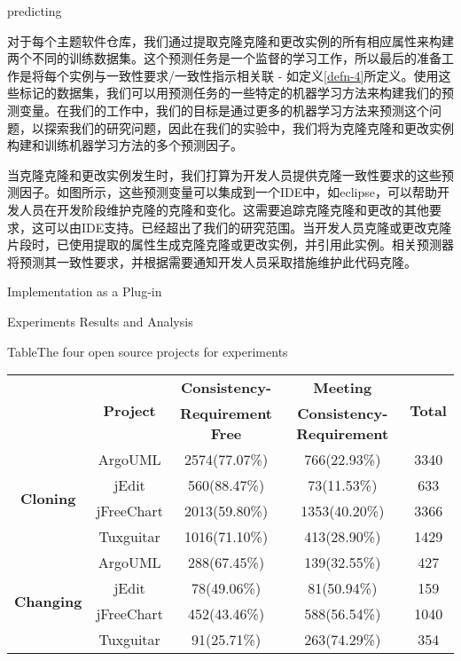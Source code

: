 {predicting}

对于每个主题软件仓库，我们通过提取克隆克隆和更改实例的所有相应属性来构建两个不同的训练数据集。这个预测任务是一个监督的学习工作，所以最后的准备工作是将每个实例与一致性要求/一致性指示相关联 - 如定义\ref {defn-4}所定义。使用这些标记的数据集，我们可以用预测任务的一些特定的机器学习方法来构建我们的预测变量。在我们的工作中，我们的目标是通过更多的机器学习方法来预测这个问题，以探索我们的研究问题，因此在我们的实验中，我们将为克隆克隆和更改实例构建和训练机器学习方法的多个预测因子。

当克隆克隆和更改实例发生时，我们打算为开发人员提供克隆一致性要求的这些预测因子。如图所示，这些预测变量可以集成到一个IDE中，如eclipse，可以帮助开发人员在开发阶段维护克隆的克隆和变化。这需要追踪克隆克隆和更改的其他要求，这可以由IDE支持。已经超出了我们的研究范围。当开发人员克隆或更改克隆片段时，已使用提取的属性生成克隆克隆或更改实例，并引用此实例。相关预测器将预测其一致性要求，并根据需要通知开发人员采取措施维护此代码克隆。

{Implementation as a Plug-in}


{Experiments Results and Analysis}

\begin{table*}[ht]
{Table$\!$}{The four open source projects for experiments}
\vspace{0.5em}
\centering
\wuhao
\begin{tabular}{ccccc}
\toprule[1.5pt]
~\multirow{2}{*}{\textbf{Instances}}&\multirow{2}{*}{\textbf{Project}}&\textbf{Consistency-} &\textbf{Meeting} &\multirow{2}{*}{\textbf{Total}}\\
~&~&\textbf{Requirement Free}&\textbf{Consistency-Requirement}&~\\
\midrule[1pt]
\multirow{4}{*}{\textbf{Cloning}}
&ArgoUML&	2574(77.07\%)&	766(22.93\%)&	3340\\
&jEdit&560(88.47\%)&	73(11.53\%)&	633\\
&jFreeChart&	2013(59.80\%)&	1353(40.20\%)&	3366\\
&Tuxguitar&	1016(71.10\%)&	413(28.90\%)&	1429\\
\hline
\multirow{4}{*}{\textbf{Changing}}
&ArgoUML&288(67.45\%)&139(32.55\%)&427\\
&jEdit&78(49.06\%)&81(50.94\%)&159\\
&jFreeChart&452(43.46\%)&588(56.54\%)&1040\\
&Tuxguitar&91(25.71\%)&263(74.29\%)&354\\
\bottomrule[1.5pt]
\end{tabular}
\end{table*}

